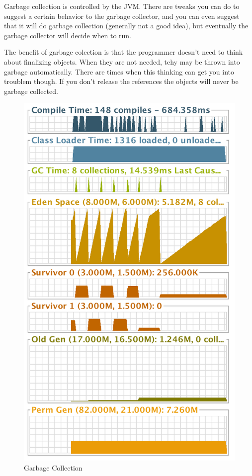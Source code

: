 \documentclass[fleqn,10pt]{SelfArx} %
\begin{document}
Garbage collection is controlled by the JVM. There are tweaks you can do to suggest a certain behavior to the garbage collector, and you can even suggest that it will do garbage collection (generally not a good idea), but eventually the garbage collector will decide when to run.

The benefit of garbage colection is that the programmer doesn't need to think about finalizing objects. When they are not needed, tehy may be thrown into garbage automatically. There are times when this thinking can get you into troublem though. If you don't release the references the objects will never be garbage collected.
\begin{figure}[ht]\centering %
\includegraphics[width=\linewidth]{garbage-collection}
\caption{Garbage Collection}
\label{fig:garbage-collection}
\end{figure}
\end{document}
